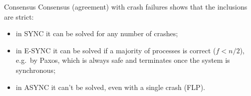 \begin{framedex}{Consensus}
  Consensus (agreement) with crash failures shows that the inclusions are strict:
  \begin{itemize}
    \item in SYNC it can be solved for any number of crashes;
    \item in E-SYNC it can be solved if a majority of processes is correct ($f < n/2$), e.g.\ by Paxos, which is always safe and terminates once the system is synchronous;
    \item in ASYNC it can't be solved, even with a single crash (FLP).
  \end{itemize}
\end{framedex}
